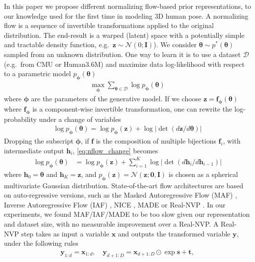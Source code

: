 \documentclass[runningheads]{llncs}
\newcommand{\thetab}{\bm{\theta}}
\newcommand{\bphi}{\bm{\phi}}
\newcommand{\tb}{\mathbf{t}}
\newcommand{\zz}{\mathbf{z}}
\newcommand{\xx}{\mathbf{x}}
\newcommand{\yy}{\mathbf{y}}
\newcommand{\ff}{\mathbf{f}}
\newcommand{\hh}{\mathbf{h}}
\newcommand{\eg}{e.g.\ }
\newcommand{\Ib}{\mathbf{I}}
\begin{document}
  In this paper we propose different normalizing flow-based prior representations, to our knowledge used for the first time in modeling 3D human pose. A normalizing flow \cite{rezende2015variational,dinh2014nice,dinh2016density,kingma2018glow} is a sequence of invertible transformations applied to the original distribution. The end-result is a warped (latent) space with a potentially simple and tractable density function, \eg $\zz \sim \mathcal{N}(0; \Ib)$). We consider $\thetab \sim p^*(\thetab)$ sampled from an unknown distribution. One way to learn it is to use a dataset $\mathcal{D}$ (\eg from CMU or Human3.6M) and maximize data log-likelihood with respect to a parametric model $p_{\bphi}(\thetab)$
\begin{align}
    \max_{\bphi} \sum_{\thetab \in \mathcal{D}} \log p_{\bphi}(\thetab)
\end{align}
where $\bphi$ are the parameters of the generative model.
If we choose $\zz = \ff_{\bphi}(\thetab)$ where $\ff_{\bphi}$ is a component-wise invertible transformation, one can rewrite the log-probability under a change of variables
\begin{align}
    \log p_{\bphi}(\thetab) = \log p_{\bphi}(\zz) + \log \left|\det(d\zz/d\thetab)\right| \label{eq:nflow_change}
\end{align}
Dropping the subscript $\bphi$, if $\ff$ is the composition of multiple bijections $\ff_i$, with intermediate output $\hh_i$, \eqref{eq:nflow_change} becomes
\begin{align}
    \log p_{\bphi}(\thetab) &= \log p_{\bphi}(\zz) + \sum_{i=1}^{K} \log \left|\det(d\hh_i/d\hh_{i-1})\right| \label{eq:nflow_change_factorized} 
\end{align}
where $\hh_0 = \thetab$ and $\hh_K = \zz$, and $p_{\bphi}(\zz) = \mathcal{N}(\zz; \mathbf{0}, \Ib)$ is chosen as a spherical multivariate Gaussian distribution. State-of-the-art flow architectures are based on auto-regressive versions, such as the Masked Autoregressive Flow (MAF) \cite{papamakarios2017masked}, Inverse Autoregressive Flow (IAF) \cite{kingma2016improved}, NICE \cite{dinh2014nice}, MADE \cite{germain2015made} or Real-NVP \cite{dinh2016density}. In our experiments, we found MAF/IAF/MADE to be too slow given our representation and dataset size, with no measurable improvement over a Real-NVP. A Real-NVP step takes as input a variable $\xx$ and outputs the transformed variable $\yy$, under the following rules
\begin{align}
    \yy_{1:d} = \xx_{1:d}, \quad
    \yy_{d+1:D} = \xx_{d+1:D} \odot \exp{\mathbf{s}} + \tb,
\end{align}
\end{document}
